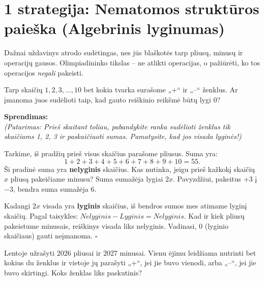 \documentclass[11pt,a4paper]{scrartcl}
\newenvironment{solution}
    {\begin{list}{}{\setlength{\leftmargin}{10pt}\setlength{\rightmargin}{10pt}}\item[]}
    {\end{list}}
\begin{document}
\section{1 strategija: Nematomos struktūros paieška (Algebrinis lyginumas)}

Dažnai uždavinys atrodo sudėtingas, nes jūs blaškotės tarp pliusų, minusų ir operacijų gausos. Olimpiadininko tikslas – ne atlikti operacijas, o pažiūrėti, ko tos operacijos \textit{negali} pakeisti.

\begin{example}
Tarp skaičių $1, 2, 3, \ldots, 10$ bet kokia tvarka surašome „+“ ir „–“ ženklus. Ar įmanoma juos sudėlioti taip, kad gauto reiškinio reikšmė būtų lygi $0$?
\end{example}

\begin{solution}
\textbf{Sprendimas:} \\
\textit{(Patarimas: Prieš skaitant toliau, pabandykite ranka sudėlioti ženklus tik skaičiams 1, 2, 3 ir paskaičiuoti sumas. Pamatysite, kad jos visada lyginės!)}

Tarkime, iš pradžių prieš visus skaičius parašome pliusus. Suma yra:
\[
1+2+3+4+5+6+7+8+9+10 = 55.
\]
Ši pradinė suma yra \textbf{nelyginis} skaičius. Kas nutinka, jeigu prieš kažkokį skaičių $x$ pliusą pakeičiame minusu? Suma sumažėja lygiai $2x$. Pavyzdžiui, pakeitus $+3$ į $-3$, bendra suma sumažėja $6$.

Kadangi $2x$ visada yra \textbf{lyginis} skaičius, iš bendros sumos mes atimame lyginį skaičių. Pagal taisykles: $Nelyginis - Lyginis = Nelyginis$. Kad ir kiek pliusų pakeistume minusais, reiškinys visada liks nelyginis. Vadinasi, $0$ (lyginio skaičiaus) gauti neįmanoma. \hfill $\square$
\end{solution}

\begin{example}
Lentoje užrašyti 2026 pliusai ir 2027 minusai. Vienu ėjimu leidžiama nutrinti bet kokius du ženklus ir vietoje jų parašyti „+“, jei jie buvo vienodi, arba „–“, jei jie buvo skirtingi. Koks ženklas liks paskutinis?
\end{example}
\end{document}
